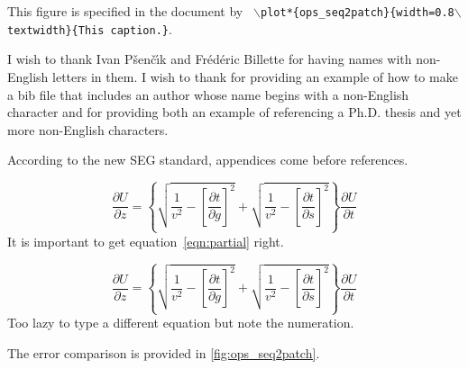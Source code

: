 \documentclass[wordlite,texlive,final]{segabs}
\begin{document}
{This figure is specified in the
  document by \texttt{
    $\backslash$plot*\{ops\_seq2patch\}\{width=0.8$\backslash$textwidth\}\{This caption.\}}.  }

I wish to thank Ivan P\v{s}en\v{c}\'{\i}k and Fr\'ed\'eric Billette
for having names with non-English letters in them.  I wish to thank
\cite{Cerveny} for providing an example of how to make a bib file that
includes an author whose name begins with a non-English character and
\cite{forgues96} for providing both an example of referencing a Ph.D.
thesis and yet more non-English characters.


According to the new SEG standard, appendices come before references.

\begin{equation}
\frac{\partial U}{\partial z} = 
\left\{
  \sqrt{\frac{1}{v^2} - \left[\frac{\partial t}{\partial g}\right]^2} +
  \sqrt{\frac{1}{v^2} - \left[\frac{\partial t}{\partial s}\right]^2}
\right\}
\frac{\partial U}{\partial t}
\label{eqn:partial}
\end{equation}
It is important to get equation~\ref{eqn:partial} right.


\begin{equation}
\frac{\partial U}{\partial z} = 
\left\{
  \sqrt{\frac{1}{v^2} - \left[\frac{\partial t}{\partial g}\right]^2} +
  \sqrt{\frac{1}{v^2} - \left[\frac{\partial t}{\partial s}\right]^2}
\right\}
\frac{\partial U}{\partial t}
\label{eqn:partial2}
\end{equation}
Too lazy to type a different equation but note the numeration.

The error comparison is provided in \autoref{fig:ops_seq2patch}.
  
\lipsum[1-2]

\onecolumn

%

\twocolumn

\end{document}
